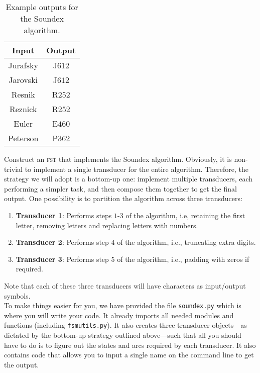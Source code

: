 \documentclass[11pt]{article}
\begin{document}
\begin{table}[htbp]
	\begin{center}
		\begin{tabular}{|c|c|}
			\hline
			\textbf{Input} & \textbf{Output} \\ \hline \hline
			Jurafsky & J$612$ \\ \hline
			Jarovski & J$612$ \\ \hline
			Resnik & R$252$ \\ \hline
			Reznick & R$252$ \\ \hline
			Euler & E$460$ \\ \hline
			Peterson & P$362$ \\ \hline
			\end{tabular}
		\caption{Example outputs for the Soundex algorithm.}\label{tbl:soundex}
\end{center}
\end{table}

 Construct an \textsc{fst} that implements the Soundex
 algorithm. Obviously, it is non-trivial to implement a single
 transducer for the entire algorithm. Therefore, the strategy we will
 adopt is a bottom-up one: implement multiple transducers, each
 performing a simpler task, and then compose them together to get the
 final output. One possibility is to partition the algorithm across
 three transducers:
\begin{enumerate}
	\item \textbf{Transducer 1}: Performs steps $1$-$3$ of the
          algorithm, i.e, retaining the first letter, removing letters
          and replacing letters with numbers.
	\item \textbf{Transducer 2}: Performs step $4$ of the
          algorithm, i.e., truncating extra digits.
	\item \textbf{Transducer 3}: Performs step $5$ of the
          algorithm, i.e., padding with zeros if required. \\
\end{enumerate}

 Note that each of these three transducers will have characters as
 input/output symbols.  \\

 To make things easier for you, we have provided the file
 \texttt{soundex.py} which is where you will write your code. It
 already imports all needed modules and functions (including
 \texttt{fsmutils.py}). It also creates three transducer objects---as
 dictated by the bottom-up strategy outlined above---such that all you
 should have to do is to figure out the states and arcs required by
 each transducer. It also contains code that allows you to input a
 single name on the command line to get the output.
\end{document}
